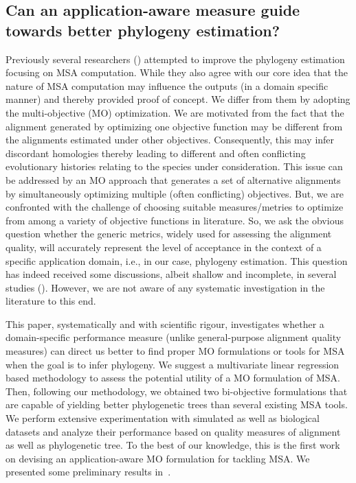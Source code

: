 \subsection{Can an application-aware measure guide towards better
phylogeny estimation?}
Previously several researchers (\citep{redelings2005joint, ashkenazy2018multiple}) attempted to improve the phylogeny estimation focusing on MSA computation. While they also agree with our core idea that the nature of MSA computation may influence the outputs (in a domain specific manner) and thereby provided proof of concept. We differ from them by adopting the multi-objective (MO) optimization.
We are motivated from the fact that the alignment generated by optimizing one objective function may be different from the alignments estimated under other objectives. Consequently, this may infer discordant homologies thereby leading to different and often conflicting evolutionary histories relating to the species under consideration. This issue can be addressed by an MO approach that generates a set of alternative alignments by simultaneously optimizing multiple (often conflicting) objectives. But, we are confronted with the challenge of choosing suitable measures/metries to optimize from among a variety of objective functions in literature.
So, we ask the obvious question whether the generic metrics, widely used for assessing the alignment quality, will accurately represent the level of acceptance in the context of a specific application domain, i.e., in our case, phylogeny estimation.
This question has indeed received some discussions, albeit shallow and incomplete, in several studies (\citep{mirarab2015pasta, liu2009rapid}). However, we are not aware of any systematic investigation in the literature to this end. 



This paper, systematically and with scientific rigour, investigates whether a domain-specific performance measure (unlike general-purpose alignment quality measures) can direct us better to find proper MO formulations or tools for MSA when the goal is to infer phylogeny. We suggest a multivariate linear regression based methodology to assess the potential utility of a MO formulation of MSA. Then, following our methodology, we obtained two bi-objective formulations that are capable of yielding better phylogenetic trees than several existing MSA tools.
We perform extensive experimentation with simulated as well as biological datasets and analyze their performance based on quality measures of alignment as well as phylogenetic tree. 
To the best of our knowledge, this is the first work on devising an application-aware MO formulation for tackling MSA. We presented some preliminary results in~\cite{nayeem2019phylogeny}.



